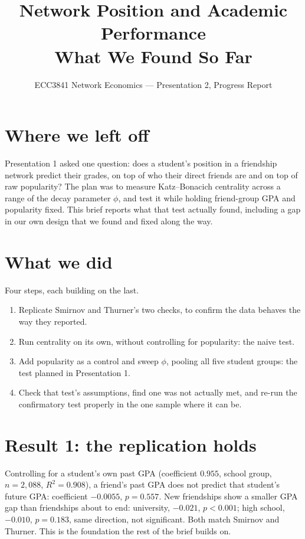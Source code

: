 \documentclass[11pt]{article}
\title{\vspace{-2em}\textbf{\LARGE Network Position and Academic Performance}\\[0.4em]
\large What We Found So Far}
\author{}
\date{ECC3841 Network Economics --- Presentation 2, Progress Report}
\begin{document}
\maketitle
\vspace{-2.5em}

\section*{Where we left off}

Presentation 1 asked one question: does a student's position in a friendship network
predict their grades, on top of who their direct friends are and on top of raw
popularity? The plan was to measure Katz--Bonacich centrality across a range of the
decay parameter $\phi$, and test it while holding friend-group GPA and popularity
fixed. This brief reports what that test actually found, including a gap in our own
design that we found and fixed along the way.

\section*{What we did}

Four steps, each building on the last.
\begin{enumerate}
  \item Replicate Smirnov and Thurner's two checks, to confirm the data behaves the
        way they reported.
  \item Run centrality on its own, without controlling for popularity: the naive test.
  \item Add popularity as a control and sweep $\phi$, pooling all five student groups:
        the test planned in Presentation 1.
  \item Check that test's assumptions, find one was not actually met, and re-run the
        confirmatory test properly in the one sample where it can be.
\end{enumerate}

\section*{Result 1: the replication holds}

Controlling for a student's own past GPA (coefficient $0.955$, school group,
$n=2{,}088$, $R^2=0.908$), a friend's past GPA does not predict that student's future
GPA: coefficient $-0.0055$, $p=0.557$. New friendships show a smaller GPA gap than
friendships about to end: university, $-0.021$, $p<0.001$; high school, $-0.010$,
$p=0.183$, same direction, not significant. Both match Smirnov and Thurner. This is
the foundation the rest of the brief builds on.
\end{document}

